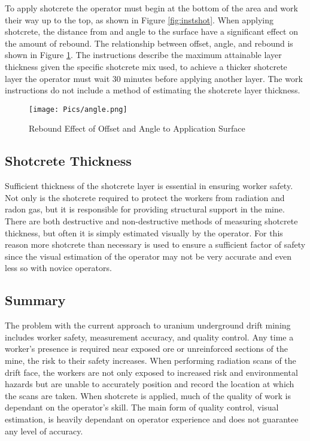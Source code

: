 To apply shotcrete the operator must begin at the bottom of the area and work their way up to the top, as shown in Figure \ref{fig:instshot}. When applying shotcrete, the distance from and angle to the surface have a significant effect on the amount of rebound. The relationship between offset, angle, and rebound is shown in Figure \ref{fig:rebound}. The instructions describe the maximum attainable layer thickness given the specific shotcrete mix used, to achieve a thicker shotcrete layer the operator must wait 30 minutes before applying another layer. The work instructions do not include a method of estimating the shotcrete layer thickness.\\

\begin{figure}
    \centering
    \texttt{[image: Pics/angle.png]}
    \caption{Rebound Effect of Offset and Angle to Application Surface \cite{camedoc}}
    \label{fig:rebound}
\end{figure}

\subsection{Shotcrete Thickness}

Sufficient thickness of the shotcrete layer is essential in ensuring worker safety. Not only is the shotcrete required to protect the workers from radiation and radon gas, but it is responsible for providing structural support in the mine. There are both destructive and non-destructive methods of measuring shotcrete thickness, but often it is simply estimated visually by the operator. For this reason more shotcrete than necessary is used to ensure a sufficient factor of safety since the visual estimation of the operator may not be very accurate and even less so with novice operators.\\

\subsection{Summary}

The problem with the current approach to uranium underground drift mining includes worker safety, measurement accuracy, and quality control. Any time a worker's presence is required near exposed ore or unreinforced sections of the mine, the risk to their safety increases. When performing radiation scans of the drift face, the workers are not only exposed to increased risk and environmental hazards but are unable to accurately position and record the location at which the scans are taken. When shotcrete is applied, much of the quality of work is dependant on the operator's skill. The main form of quality control, visual estimation, is heavily dependant on operator experience and does not guarantee any level of accuracy.\\

